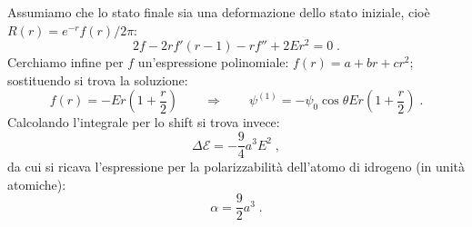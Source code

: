 \documentclass[12pt,a4paper]{report}
\theoremstyle{definition}
\numberwithin{equation}{section}
\begin{document}
Assumiamo che lo stato finale sia una deformazione dello stato iniziale, cioè $R(r)=e^{-r}f(r)/2\pi$:
\begin{equation}
2f-2rf'(r-1)-rf''+2Er^2=0\;.
\end{equation}
Cerchiamo infine per $f$ un'espressione polinomiale: $f(r)=a+br+cr^2$; sostituendo si trova la soluzione:
\begin{equation}
f(r)=-Er\left(1+\frac{r}{2}\right)\qquad\Longrightarrow\qquad \psi^{(1)}=-\psi_0\cos\theta Er\left(1+\frac{r}{2}\right)\;.
\end{equation}
Calcolando l'integrale per lo shift si trova invece:
\begin{equation}
\Delta\mathcal{E}=-\frac{9}{4}a^3E^2\;,
\end{equation}
da cui si ricava l'espressione per la polarizzabilità dell'atomo di idrogeno (in unità atomiche):
\begin{equation}
\alpha=\frac{9}{2}a^3\;.
\end{equation}
\end{document}

